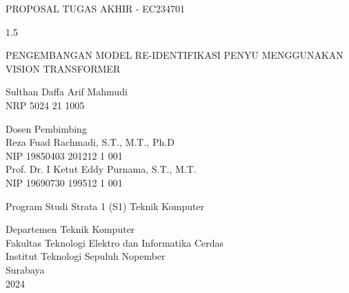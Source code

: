 \begin{large}
  PROPOSAL TUGAS AKHIR - EC234701
\end{large}

\vspace{\fill}

\begin{spacing}{1.5}
  \begin{Large}
    PENGEMBANGAN MODEL RE-IDENTIFIKASI PENYU MENGGUNAKAN VISION TRANSFORMER
  \end{Large}
\end{spacing}

\vspace{\fill}

\begin{large}
  Sulthan Daffa Arif Mahmudi \\
  \textmd{NRP 5024 21 1005}
\end{large}

\vspace{\fill}

\begin{large}
  \textmd{Dosen Pembimbing} \\
  Reza Fuad Rachmadi, S.T., M.T., Ph.D \\
  \textmd{NIP 19850403 201212 1 001} \\
  Prof. Dr. I Ketut Eddy Purnama, S.T., M.T. \\
  \textmd{NIP 19690730 199512 1 001}
\end{large}

\vspace{\fill}

Program Studi Strata 1 (S1) Teknik Komputer \\

\mdseries

Departemen Teknik Komputer \\
Fakultas Teknologi Elektro dan Informatika Cerdas \\
Institut Teknologi Sepuluh Nopember \\

Surabaya \\
2024

